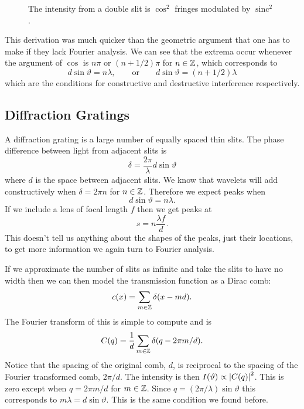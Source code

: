 \documentclass[a4paper]{article}
\DeclareMathOperator{\sinc}{sinc}
\begin{document}
    \begin{figure}[ht]
        \centering
        \caption{The intensity from a double slit is \(\cos^2\) fringes modulated by \(\sinc^2\).}
        \label{fig:double slit intensity}
    \end{figure}
    
    This derivation was much quicker than the geometric argument that one has to make if they lack Fourier analysis.
    We can see that the extrema occur whenever the argument of \(\cos\) is \(n\pi\) or \((n + 1/2)\pi\) for \(n\in\mathbb{Z}\), which corresponds to 
    \[d\sin\vartheta = n\lambda, \qquad\text{or}\qquad d\sin\vartheta = (n + 1/2)\lambda\]
    which are the conditions for constructive and destructive interference respectively.
    
    \subsection{Diffraction Gratings}\label{sec:diffraction gratings}
    A diffraction grating is a large number of equally spaced thin slits.
    The phase difference between light from adjacent slits is
    \[\delta = \frac{2\pi}{\lambda}d\sin\vartheta\]
    where \(d\) is the space between adjacent slits.
    We know that wavelets will add constructively when \(\delta = 2\pi n\) for \(n\in\mathbb{Z}\).
    Therefore we expect peaks when
    \[d\sin\vartheta = n\lambda.\]
    If we include a lens of focal length \(f\) then we get peaks at
    \[s = n\frac{\lambda f}{d}.\]
    This doesn't tell us anything about the shapes of the peaks, just their locations, to get more information we again turn to Fourier analysis.
    
    If we approximate the number of slits as infinite and take the slits to have no width then we can then model the transmission function as a Dirac comb:
    \[c(x) = \sum_{m\in\mathbb{Z}} \delta(x - md).\]
    The Fourier transform of this is simple to compute and is
    \[C(q) = \frac{1}{d}\sum_{m\in\mathbb{Z}} \delta(q - 2\pi m/d).\]
    Notice that the spacing of the original comb, \(d\), is reciprocal to the spacing of the Fourier transformed comb, \(2\pi/d\).
    The intensity is then \(I(\vartheta) \propto \abs{C(q)}^2\).
    This is zero except when \(q = 2\pi m/d\) for \(m\in\mathbb{Z}\).
    Since \(q = (2\pi/\lambda)\sin\vartheta\) this corresponds to \(m\lambda = d\sin\vartheta\).
    This is the same condition we found before.
    
\end{document}
